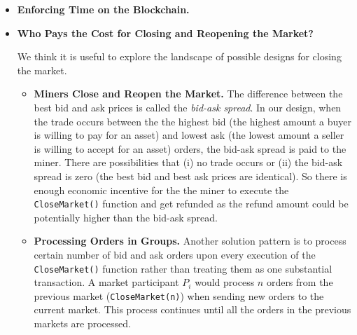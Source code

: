 \begin{itemize}

\item\textbf{{Enforcing Time on the Blockchain.}}






\item\textbf{{Who Pays the Cost for Closing and Reopening the Market?}}

We think it is useful to explore the landscape of possible designs for closing the market. 

\begin{itemize}

\item \textbf {Miners Close and Reopen the Market.} The difference between the best bid and ask prices is called the \textit{bid-ask spread}. In our design, when the trade occurs between the the highest bid (the highest amount a buyer is willing to pay for an asset) and lowest ask (the lowest amount a seller is willing to accept for an asset) orders, the bid-ask spread is paid to the miner. There are possibilities that (i) no trade occurs or (ii) the bid-ask spread is zero (\ie the best bid and best ask prices are identical). So there is enough economic incentive for the the miner to execute the \texttt{CloseMarket()} function and get refunded as the refund amount could be potentially higher than the bid-ask spread. 

\item \textbf{Processing Orders in Groups.} Another solution pattern is to process certain number of bid and ask orders upon every execution of the \texttt{CloseMarket()} function rather than treating them as one substantial transaction. A market participant $P_i$ would process $n$ orders from the previous market (\texttt{CloseMarket(n)}) when sending new orders to the current market. This process continues until all the orders in the previous markets are processed. %


\end{itemize}
\end{itemize}
